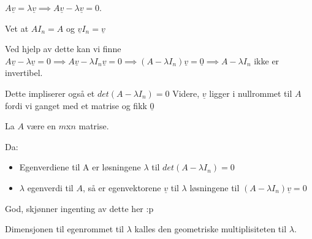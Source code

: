 \documentclass[11pt, a4paper, norsk]{article}
\begin{document}
        $A\underline{v} = \lambda \underline{v} \implies A\underline{v} - \lambda\underline{v} = 0$.

        Vet at $AI_{n} = A$ og $\underline{v}I_{n} = \underline{v}$ 

        Ved hjelp av dette kan vi finne $A\underline{v} - \lambda \underline{v} = 0 \implies A\underline{v} - \lambda I_{n}\underline{v} = 0 \implies (A-\lambda I_{n}) \underline{v} = \underline{0} \implies A - \lambda I_{n}$ ikke er invertibel.

        Dette impliserer også et $det(A - \lambda I_{n}) = 0$
        Videre, $\underline{v}$ ligger i nullrommet til $A$ fordi vi ganget med et matrise og fikk $\underline{0}$

        \begin{Theorem}{}{}
            La $A$ være en $m$x$n$ matrise. 

            Da:
            \begin{itemize}
                \item Egenverdiene til A er løsningene $\lambda$ til $det(A - \lambda I_{n}) = 0$
            \item $\lambda$ egenverdi til $A$, så er egenvektorene $\underline{v}$ til $\lambda$ løsningene til $(A - \lambda I_{n})\underline{v} = 0$ 
            \end{itemize}
            God, skjønner ingenting av dette her :p
        \end{Theorem}

        \begin{Definition}{}{}
            Dimensjonen til egenrommet til $\lambda$ kalles den geometriske multiplisiteten til $\lambda$. 
        \end{Definition}
\end{document}

